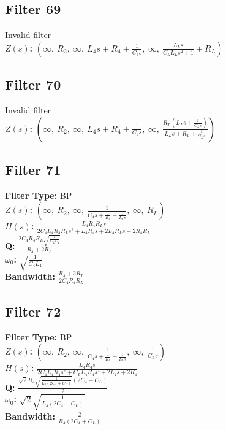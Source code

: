 \documentclass{article}
\begin{document}
\subsection*{Filter 69}
Invalid filter \\ 
\textbf{$Z(s)$:} $\left( \infty, \  R_{2}, \  \infty, \  L_{4} s + R_{4} + \frac{1}{C_{4} s}, \  \infty, \  \frac{L_{L} s}{C_{L} L_{L} s^{2} + 1} + R_{L}\right)$ \\ 
\subsection*{Filter 70}
Invalid filter \\ 
\textbf{$Z(s)$:} $\left( \infty, \  R_{2}, \  \infty, \  L_{4} s + R_{4} + \frac{1}{C_{4} s}, \  \infty, \  \frac{R_{L} \left(L_{L} s + \frac{1}{C_{L} s}\right)}{L_{L} s + R_{L} + \frac{1}{C_{L} s}}\right)$ \\ 
\subsection*{Filter 71}
\textbf{Filter Type:} BP \\ 
\textbf{$Z(s)$:} $\left( \infty, \  R_{2}, \  \infty, \  \frac{1}{C_{4} s + \frac{1}{R_{4}} + \frac{1}{L_{4} s}}, \  \infty, \  R_{L}\right)$ \\ 
\textbf{$H(s)$:} $\frac{L_{4} R_{4} R_{L} s}{2 C_{4} L_{4} R_{4} R_{L} s^{2} + L_{4} R_{4} s + 2 L_{4} R_{L} s + 2 R_{4} R_{L}}$ \\ 
\textbf{Q:} $\frac{2 C_{4} R_{4} R_{L} \sqrt{\frac{1}{C_{4} L_{4}}}}{R_{4} + 2 R_{L}}$ \\ 
\textbf{$\omega_0$:} $\sqrt{\frac{1}{C_{4} L_{4}}}$ \\ 
\textbf{Bandwidth:} $\frac{R_{4} + 2 R_{L}}{2 C_{4} R_{4} R_{L}}$ \\ 
\subsection*{Filter 72}
\textbf{Filter Type:} BP \\ 
\textbf{$Z(s)$:} $\left( \infty, \  R_{2}, \  \infty, \  \frac{1}{C_{4} s + \frac{1}{R_{4}} + \frac{1}{L_{4} s}}, \  \infty, \  \frac{1}{C_{L} s}\right)$ \\ 
\textbf{$H(s)$:} $\frac{L_{4} R_{4} s}{2 C_{4} L_{4} R_{4} s^{2} + C_{L} L_{4} R_{4} s^{2} + 2 L_{4} s + 2 R_{4}}$ \\ 
\textbf{Q:} $\frac{\sqrt{2} R_{4} \sqrt{\frac{1}{L_{4} \left(2 C_{4} + C_{L}\right)}} \left(2 C_{4} + C_{L}\right)}{2}$ \\ 
\textbf{$\omega_0$:} $\sqrt{2} \sqrt{\frac{1}{L_{4} \left(2 C_{4} + C_{L}\right)}}$ \\ 
\textbf{Bandwidth:} $\frac{2}{R_{4} \left(2 C_{4} + C_{L}\right)}$ \\ 
\end{document}
